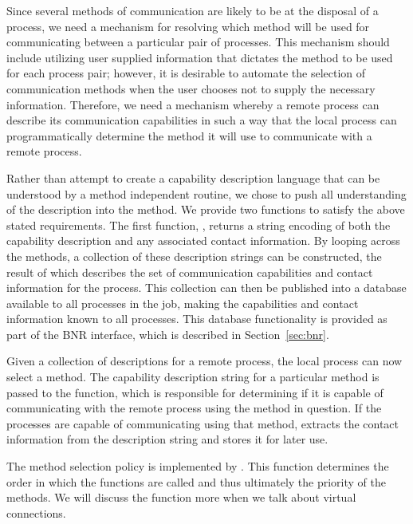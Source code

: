 Since several methods of communication are likely to be at the disposal of a
process, we need a mechanism for resolving which method will be used for
communicating between a particular pair of processes.  This mechanism should
include utilizing user supplied information that dictates the method to be used
for each process pair; however, it is desirable to automate the selection of
communication methods when the user chooses not to supply the necessary
information.  Therefore, we need a mechanism whereby a remote process can
describe its communication capabilities in such a way that the local process
can programmatically determine the method it will use to communicate with a
remote process.

Rather than attempt to create a capability description language that can be
understood by a method independent routine, we chose to push all understanding
of the description into the method.  We provide two functions to satisfy the
above stated requirements.  The first function, ,
returns a string encoding of both the capability description and any associated
contact information.  By looping across the methods, a collection of these
description strings can be constructed, the result of which describes the set
of communication capabilities and contact information for the process.  This
collection can then be published into a database available to all processes in
the job, making the capabilities and contact information known to all
processes.  This database functionality is provided as part of the BNR
interface, which is described in Section~\ref{sec:bnr}.

Given a collection of descriptions for a remote process, the local process can
now select a method.  The capability description string for a particular method
is passed to the  function, which is
responsible for determining if it is capable of communicating with the remote
process using the method in question.  If the processes are capable of
communicating using that method,  extracts the contact
information from the description string and stores it for later use.

The method selection policy is implemented by .  This
function determines the order in which the 
functions are called and thus ultimately the priority of the methods.  We will
discuss the  function more when we talk about virtual
connections.

